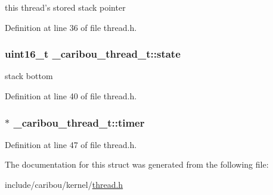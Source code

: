 this thread's stored stack pointer 



Definition at line 36 of file thread.\-h.

\hypertarget{struct__caribou__thread__t_a9896ce34d6cb9832eca2456d281b2eec}{
\subsubsection[{state}]{\setlength{\rightskip}{0pt plus 5cm}uint16\-\_\-t \-\_\-caribou\-\_\-thread\-\_\-t\-::state}}\label{struct__caribou__thread__t_a9896ce34d6cb9832eca2456d281b2eec}


stack bottom 



Definition at line 40 of file thread.\-h.

\hypertarget{struct__caribou__thread__t_a0b044d7f5d93f8d457ff985f0f7e4bd3}{
\subsubsection[{timer}]{$\ast$ \-\_\-caribou\-\_\-thread\-\_\-t\-::timer}}\label{struct__caribou__thread__t_a0b044d7f5d93f8d457ff985f0f7e4bd3}


Definition at line 47 of file thread.\-h.



The documentation for this struct was generated from the following file\-:\begin{DoxyCompactItemize}
\item 
include/caribou/kernel/\hyperlink{thread_8h}{thread.\-h}\end{DoxyCompactItemize}
